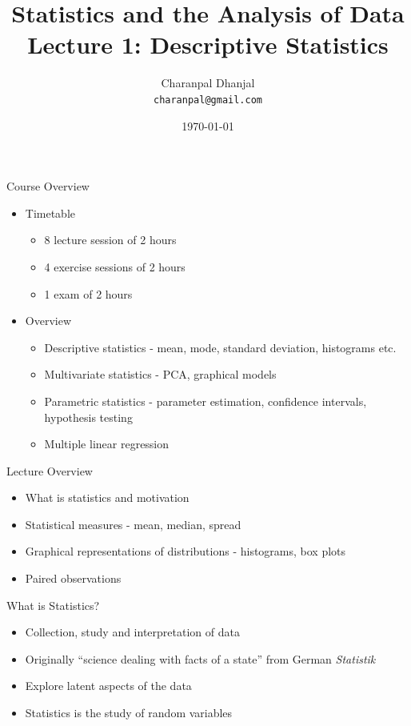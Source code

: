 \documentclass{beamer}
\title{Statistics and the Analysis of Data\\ Lecture 1: Descriptive Statistics}
\author{Charanpal Dhanjal \\ \texttt{charanpal@gmail.com}}
\institute{\'{E}cole des Ponts}
\date{\today}
\begin{document}
\frame{\titlepage}

\begin{frame}{Course Overview}
\begin{itemize}
\item Timetable 
\begin{itemize}
\item 8 lecture session of 2 hours
\item 4 exercise sessions of 2 hours
\item 1 exam of 2 hours 
\end{itemize}
\item Overview
\begin{itemize} 
\item Descriptive statistics - mean, mode, standard deviation, histograms etc. 
\item Multivariate statistics - PCA, graphical models
\item Parametric statistics - parameter estimation, confidence intervals, hypothesis testing    
\item Multiple linear regression 
\end{itemize}
\end{itemize}
\end{frame}

\begin{frame}{Lecture Overview}
\begin{itemize} 
 \item What is statistics and motivation
\item Statistical measures - mean, median, spread 
\item Graphical representations of distributions - histograms, box plots 
\item Paired observations  
\end{itemize}
\end{frame}

\begin{frame}{What is Statistics?}  
 \begin{itemize} 
\item Collection, study and interpretation of data 
\item Originally ``science dealing with facts of a state'' from German \emph{Statistik}
\item Explore latent aspects of the data 
\item Statistics is the study of random variables  
 \end{itemize}
\end{frame}
\end{document}
